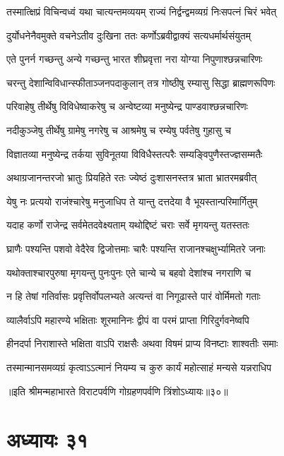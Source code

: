 \twolineshloka
{तस्मात्क्षिप्रं विचिन्वध्वं यथा चात्यन्तमव्ययम्}
{राज्यं निर्द्वन्द्वमव्यग्रं निःसपत्नं चिरं भवेत्}


\twolineshloka
{दुर्योधनेनैवमुक्ते वचनेऽतीव दुःखिना}
{ततः कर्णोऽब्रवीद्वाक्यं सत्यधर्मार्थसंयुतम्}


\twolineshloka
{एते पुनर्न गच्छन्तु अन्ये गच्छन्तु भारत}
{शीघ्रवृत्ता नरा योग्या निपुणाश्छन्नचारिणः}


\twolineshloka
{चरन्तु देशान्विविधान्स्फीताञ्जनपदाकुलान्}
{तत्र गोष्ठीषु रम्यासु सिद्धा ब्राह्मणरूपिणः}


\twolineshloka
{परिवाहेषु तीर्थेषु विविधेष्वाकरेषु च}
{अन्वेष्टव्या मनुष्येन्द्र पाण्डवाश्छन्नचारिणः}


\twolineshloka
{नदीकुञ्जेषु तीर्थेषु ग्रामेषु नगरेषु च}
{आश्रमेषु च रम्येषु पर्वतेषु गुहासु च}


\twolineshloka
{विज्ञातव्या मनुष्येन्द्र तर्कया सुविनूतया}
{विविधैस्तत्परैः सम्यङ्विपुणैस्तज्ज्ञसम्मतैः}


\twolineshloka
{अथाग्रजानन्तरजो भ्रातुः प्रियहिते रतः}
{ज्येष्ठं दुःशासनस्तत्र भ्राता भ्रातरमब्रवीत्}


\twolineshloka
{येषु नः प्रत्ययो राजंश्चारेषु मनुजाधिप}
{ते यान्तु दत्तदेया वै भूयस्तान्परिमार्गितुम्}


\twolineshloka
{यदाह कर्णो राजेन्द्र सर्वमेतदवेक्ष्यताम्}
{यथोद्दिष्टं चराः सर्वे मृगयन्तु यतस्ततः}


\twolineshloka
{घ्राणैः पश्यन्ति पशवो वेदैरेव द्विजोत्तमाः}
{चारैः पश्यन्ति राजानश्चक्षुर्भ्यामितरे जनाः}


\twolineshloka
{यथोक्ताश्चारपुरुषा मृगयन्तु पुनःपुनः}
{एते चान्ये च बहवो देशांश्च नगराणि च}


\twolineshloka
{न हि तेषां गतिर्वासः प्रवृत्तिर्वोपलभ्यते}
{अत्यन्तं वा निगूढास्ते पारं वोर्मिमतो गताः}


\twolineshloka
{व्यालैर्वाऽपि महारण्ये भक्षिताः शूरमानिनः}
{द्वीपं वा परमं प्राप्ता गिरिदुर्गवनेष्वपि}


\twolineshloka
{हीनदर्पा निराशास्ते भक्षिता वाऽपि राक्षसैः}
{अथवा विषमं प्राप्य विनष्टाः शाश्वतीः समाः}


\twolineshloka
{तस्मान्मानसमव्यग्रं कृत्वाऽऽत्मानं नियम्य च}
{कुरु कार्यं महोत्साहं मन्यसे यन्नराधिप}

॥इति श्रीमन्महाभारते विराटपर्वणि गोग्रहणपर्वणि त्रिंशोऽध्यायः॥३०॥

\chapter{अध्यायः ३१}

